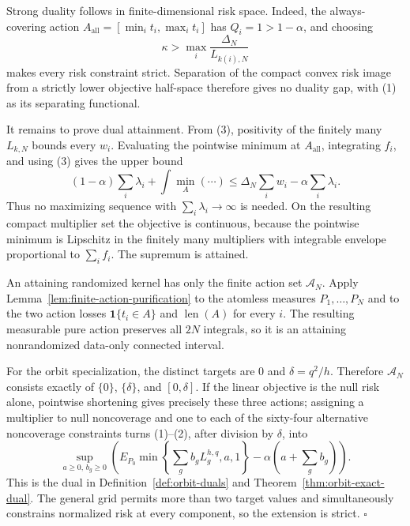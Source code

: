 Strong duality follows in finite-dimensional risk space.  Indeed, the always-covering action
\(A_{\mathrm{all}}=[\min_i t_i,\max_i t_i]\) has \(Q_i=1>1-\alpha\), and choosing
\[
 \kappa>\max_i\frac{\Delta_N}{L_{k(i),N}}
\]
makes every risk constraint strict.  Separation of the compact convex risk image from a strictly lower objective half-space therefore gives no duality gap, with (1) as its separating functional.

It remains to prove dual attainment.  From (3), positivity of the finitely many \(L_{k,N}\) bounds every \(w_i\).  Evaluating the pointwise minimum at \(A_{\mathrm{all}}\), integrating \(f_i\), and using (3) gives the upper bound
\[
 (1-\alpha)\sum_i\lambda_i+\int\min_A(\cdots)
 \leq \Delta_N\sum_iw_i-\alpha\sum_i\lambda_i.
\tag{4}
\]
Thus no maximizing sequence with \(\sum_i\lambda_i\to\infty\) is needed.  On the resulting compact multiplier set the objective is continuous, because the pointwise minimum is Lipschitz in the finitely many multipliers with integrable envelope proportional to \(\sum_i f_i\).  The supremum is attained.

An attaining randomized kernel has only the finite action set \(\mathcal A_N\).  Apply Lemma~\ref{lem:finite-action-purification} to the atomless measures \(P_1,\ldots,P_N\) and to the two action losses \(\mathbf1\{t_i\in A\}\) and \(\operatorname{len}(A)\) for every \(i\).  The resulting measurable pure action preserves all \(2N\) integrals, so it is an attaining nonrandomized data-only connected interval.

For the orbit specialization, the distinct targets are \(0\) and \(\delta=q^2/h\).  Therefore \(\mathcal A_N\) consists exactly of \(\{0\}\), \(\{\delta\}\), and \([0,\delta]\).  If the linear objective is the null risk alone, pointwise shortening gives precisely these three actions; assigning a multiplier to null noncoverage and one to each of the sixty-four alternative noncoverage constraints turns (1)--(2), after division by \(\delta\), into
\[
 \sup_{a\geq0,\,b_g\geq0}
 \left(E_{P_0}\min\left\{\sum_gb_gL_g^{h,q},a,1\right\}
 -\alpha\left(a+\sum_gb_g\right)\right).
\]
This is the dual in Definition~\ref{def:orbit-duals} and Theorem~\ref{thm:orbit-exact-dual}.  The general grid permits more than two target values and simultaneously constrains normalized risk at every component, so the extension is strict. \(\square\)